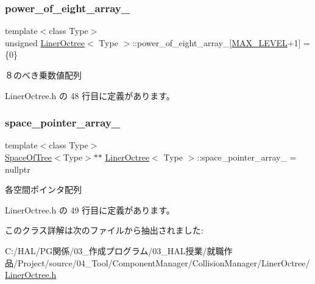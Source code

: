 \subsubsection{\texorpdfstring{power\+\_\+of\+\_\+eight\+\_\+array\+\_\+}{power\_of\_eight\_array\_}}
{\footnotesize\ttfamily template$<$class Type$>$ \\
unsigned \mbox{\hyperlink{class_liner_octree}{Liner\+Octree}}$<$ Type $>$\+::power\+\_\+of\+\_\+eight\+\_\+array\+\_\+\mbox{[}\mbox{\hyperlink{class_liner_octree_aced865f2822181486eb805e4db1f0a32}{M\+A\+X\+\_\+\+L\+E\+V\+EL}}+1\mbox{]} = \{0\}\hspace{0.3cm}{\ttfamily [private]}}



８のべき乗数値配列 



 Liner\+Octree.\+h の 48 行目に定義があります。

\mbox{\label{class_liner_octree_a0ffc2effd42779c7f88c4eecc8a68bfb}} 
\subsubsection{\texorpdfstring{space\+\_\+pointer\+\_\+array\+\_\+}{space\_pointer\_array\_}}
{\footnotesize\ttfamily template$<$class Type$>$ \\
\mbox{\hyperlink{class_space_of_tree}{Space\+Of\+Tree}}$<$Type$>$$\ast$$\ast$ \mbox{\hyperlink{class_liner_octree}{Liner\+Octree}}$<$ Type $>$\+::space\+\_\+pointer\+\_\+array\+\_\+ = nullptr\hspace{0.3cm}{\ttfamily [private]}}



各空間ポインタ配列 



 Liner\+Octree.\+h の 49 行目に定義があります。



このクラス詳解は次のファイルから抽出されました\+:\begin{DoxyCompactItemize}
\item 
C\+:/\+H\+A\+L/\+P\+G関係/03\+\_\+作成プログラム/03\+\_\+\+H\+A\+L授業/就職作品/\+Project/source/04\+\_\+\+Tool/\+Component\+Manager/\+Collision\+Manager/\+Liner\+Octree/\mbox{\hyperlink{_liner_octree_8h}{Liner\+Octree.\+h}}\end{DoxyCompactItemize}
